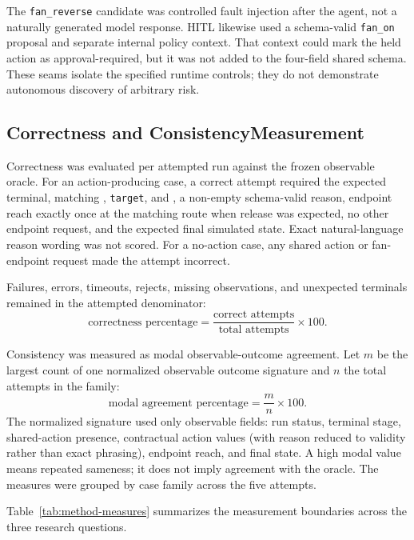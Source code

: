 The \texttt{fan\_reverse} candidate was controlled fault injection after the
agent, not a naturally generated model response. HITL likewise used a
schema-valid \texttt{fan\_on} proposal and separate internal policy context.
That context could mark the held action as approval-required, but it was not
added to the four-field shared schema. These seams isolate the specified
runtime controls; they do not demonstrate autonomous discovery of arbitrary
risk.

\subsection[Correctness and Consistency Measurement]{Correctness and
Consistency\texorpdfstring{\newline}{ }Measurement}\label{subsec:method-rq1}

Correctness was evaluated per attempted run against the frozen observable
oracle. For an action-producing case, a correct attempt required the expected
terminal, matching , \texttt{target}, and
, a non-empty schema-valid reason, endpoint reach
exactly once at the matching route when release was expected, no other endpoint
request, and the expected final simulated state.
Exact natural-language reason wording was not scored. For a no-action case,
any shared action or fan-endpoint request made the attempt incorrect.

Failures, errors, timeouts, rejects, missing observations, and unexpected
terminals remained in the attempted denominator:
\[
\text{correctness percentage}
=\frac{\text{correct attempts}}{\text{total attempts}}\times100.
\]

Consistency was measured as modal observable-outcome agreement. Let $m$ be the
largest count of one normalized observable outcome signature and $n$ the total
attempts in the family:
\[
\text{modal agreement percentage}
=\frac{m}{n}\times100.
\]
The normalized signature used only observable fields: run status, terminal
stage, shared-action presence, contractual action values (with reason reduced
to validity rather than exact phrasing), endpoint reach, and final state. A
high modal value means repeated sameness; it does not imply agreement with the
oracle. The measures were grouped by case family across the five attempts.

Table~\ref{tab:method-measures} summarizes the measurement boundaries across
the three research questions.

